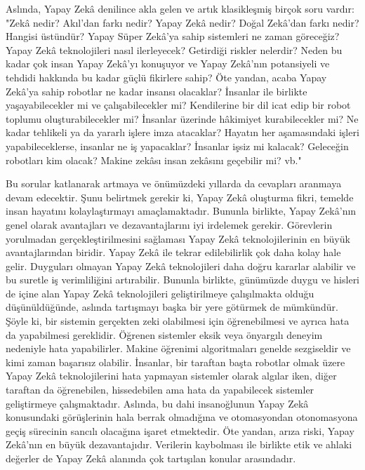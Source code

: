 \documentclass{article}
\begin{document}
\begin{multicols}{2}
\vspace{5pt}
Aslında, Yapay Zekâ denilince akla gelen ve artık klasikleşmiş birçok soru vardır: "Zekâ nedir? Akıl’dan farkı nedir? Yapay Zekâ nedir? Doğal Zekâ’dan farkı nedir?
Hangisi üstündür? Yapay Süper Zekâ’ya sahip sistemleri ne zaman göreceğiz?
Yapay Zekâ teknolojileri nasıl ilerleyecek? Getirdiği riskler nelerdir? Neden bu
kadar çok insan Yapay Zekâ’yı konuşuyor ve Yapay Zekâ’nın potansiyeli ve tehdidi hakkında bu kadar güçlü fikirlere sahip? Öte yandan, acaba Yapay Zekâ’ya sahip
robotlar ne kadar insansı olacaklar? İnsanlar ile birlikte yaşayabilecekler mi ve
çalışabilecekler mi? Kendilerine bir dil icat edip bir robot toplumu oluşturabilecekler mi? İnsanlar üzerinde hâkimiyet kurabilecekler mi? Ne kadar tehlikeli ya da
yararlı işlere imza atacaklar? Hayatın her aşamasındaki işleri yapabileceklerse,
insanlar ne iş yapacaklar? İnsanlar işsiz mi kalacak? Geleceğin robotları kim olacak? Makine zekâsı insan zekâsını geçebilir mi? vb."

Bu sorular katlanarak artmaya ve önümüzdeki yıllarda da cevapları aranmaya
devam edecektir. Şunu belirtmek gerekir ki, Yapay Zekâ oluşturma fikri, temelde insan hayatını kolaylaştırmayı amaçlamaktadır. Bununla birlikte, Yapay
Zekâ’nın genel olarak avantajları ve dezavantajlarını iyi irdelemek gerekir. Görevlerin yorulmadan gerçekleştirilmesini sağlaması Yapay Zekâ teknolojilerinin
en büyük avantajlarından biridir. Yapay Zekâ ile tekrar edilebilirlik çok daha
kolay hale gelir. Duyguları olmayan Yapay Zekâ teknolojileri daha doğru kararlar alabilir ve bu suretle iş verimliliğini artırabilir. Bununla birlikte, günümüzde
duygu ve hisleri de içine alan Yapay Zekâ teknolojileri geliştirilmeye çalışılmakta
olduğu düşünüldüğünde, aslında tartışmayı başka bir yere götürmek de mümkündür. Şöyle ki, bir sistemin gerçekten zeki olabilmesi için öğrenebilmesi ve
ayrıca hata da yapabilmesi gereklidir. Öğrenen sistemler eksik veya önyargılı
deneyim nedeniyle hata yapabilirler. Makine öğrenimi algoritmaları genelde
sezgiseldir ve kimi zaman başarısız olabilir. İnsanlar, bir taraftan başta robotlar
olmak üzere Yapay Zekâ teknolojilerini hata yapmayan sistemler olarak algılar
iken, diğer taraftan da öğrenebilen, hissedebilen ama hata da yapabilecek sistemler geliştirmeye çalışmaktadır. Aslında, bu dahi insanoğlunun Yapay Zekâ
konusundaki görüşlerinin hala berrak olmadığına ve otomasyondan otonomasyona geçiş sürecinin sancılı olacağına işaret etmektedir. Öte yandan, arıza riski,
Yapay Zekâ’nın en büyük dezavantajıdır. Verilerin kaybolması ile birlikte etik ve
ahlaki değerler de Yapay Zekâ alanında çok tartışılan konular arasındadır.


\end{multicols}
\end{document}
